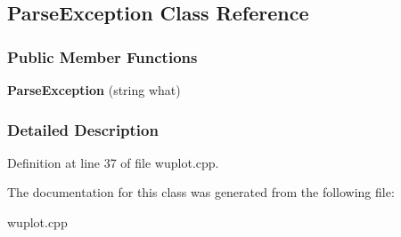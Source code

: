 \hypertarget{classParseException}{
\subsection{ParseException Class Reference}
\label{classParseException}
}
\subsubsection*{Public Member Functions}
\begin{DoxyCompactItemize}
\item 
\hypertarget{classParseException_a3704bd0b08735099b0f84e10865d2b21}{
{\bfseries ParseException} (string what)}
\label{classParseException_a3704bd0b08735099b0f84e10865d2b21}

\end{DoxyCompactItemize}


\subsubsection{Detailed Description}


Definition at line 37 of file wuplot.cpp.



The documentation for this class was generated from the following file:\begin{DoxyCompactItemize}
\item 
wuplot.cpp\end{DoxyCompactItemize}
